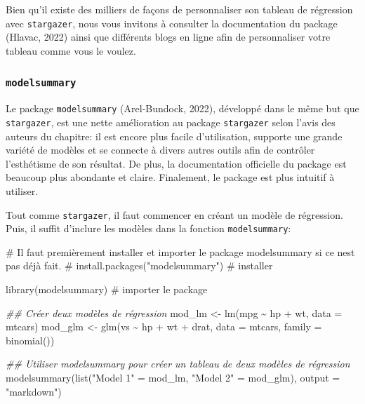 \documentclass[
  letterpaper,
  DIV=11,
  numbers=noendperiod]{scrreprt}
\newenvironment{Shaded}{\begin{snugshade}}{\end{snugshade}}
\newcommand{\AttributeTok}[1]{\textcolor[rgb]{0.40,0.45,0.13}{#1}}
\newcommand{\CommentTok}[1]{\textcolor[rgb]{0.37,0.37,0.37}{#1}}
\newcommand{\DocumentationTok}[1]{\textcolor[rgb]{0.37,0.37,0.37}{\textit{#1}}}
\newcommand{\FunctionTok}[1]{\textcolor[rgb]{0.28,0.35,0.67}{#1}}
\newcommand{\NormalTok}[1]{\textcolor[rgb]{0.00,0.23,0.31}{#1}}
\newcommand{\OtherTok}[1]{\textcolor[rgb]{0.00,0.23,0.31}{#1}}
\newcommand{\SpecialCharTok}[1]{\textcolor[rgb]{0.37,0.37,0.37}{#1}}
\newcommand{\StringTok}[1]{\textcolor[rgb]{0.13,0.47,0.30}{#1}}
\begin{document}
Bien qu'il existe des milliers de façons de personnaliser son tableau de
régression avec \texttt{stargazer}, nous vous invitons à consulter la
documentation du package (Hlavac, 2022) ainsi que différents blogs en
ligne afin de personnaliser votre tableau comme vous le voulez.

\subsubsection{\texorpdfstring{\texttt{modelsummary}}{modelsummary}}\label{sec-model-summary}

Le package \texttt{modelsummary} (Arel-Bundock, 2022), développé dans le
même but que \texttt{stargazer}, est une nette amélioration au package
\texttt{stargazer} selon l'avis des auteurs du chapitre: il est encore
plus facile d'utilisation, supporte une grande variété de modèles et se
connecte à divers autres outils afin de contrôler l'esthétisme de son
résultat. De plus, la documentation officielle du package est beaucoup
plus abondante et claire. Finalement, le package est plus intuitif à
utiliser.

Tout comme \texttt{stargazer}, il faut commencer en créant un modèle de
régression. Puis, il suffit d'inclure les modèles dans la fonction
\texttt{modelsummary}:

\begin{Shaded}
\begin{Highlighting}[]
\CommentTok{\# Il faut premièrement installer et importer le package modelsummary si ce n\textquotesingle{}est pas déjà fait.}
\CommentTok{\# install.packages("modelsummary") \# installer}

\FunctionTok{library}\NormalTok{(modelsummary) }\CommentTok{\# importer le package}
\end{Highlighting}
\end{Shaded}

\begin{Shaded}
\begin{Highlighting}[]
\DocumentationTok{\#\# Créer deux modèles de régression}
\NormalTok{mod\_lm }\OtherTok{\textless{}{-}} \FunctionTok{lm}\NormalTok{(mpg }\SpecialCharTok{\textasciitilde{}}\NormalTok{ hp }\SpecialCharTok{+}\NormalTok{ wt, }\AttributeTok{data =}\NormalTok{ mtcars)}
\NormalTok{mod\_glm }\OtherTok{\textless{}{-}} \FunctionTok{glm}\NormalTok{(vs }\SpecialCharTok{\textasciitilde{}}\NormalTok{ hp }\SpecialCharTok{+}\NormalTok{ wt }\SpecialCharTok{+}\NormalTok{ drat, }\AttributeTok{data =}\NormalTok{ mtcars, }\AttributeTok{family =} \FunctionTok{binomial}\NormalTok{())}

\DocumentationTok{\#\# Utiliser modelsummary pour créer un tableau de deux modèles de régression}
\FunctionTok{modelsummary}\NormalTok{(}\FunctionTok{list}\NormalTok{(}\StringTok{"Model 1"} \OtherTok{=}\NormalTok{ mod\_lm, }\StringTok{"Model 2"} \OtherTok{=}\NormalTok{ mod\_glm), }\AttributeTok{output =} \StringTok{"markdown"}\NormalTok{)}
\end{Highlighting}
\end{Shaded}
\end{document}
